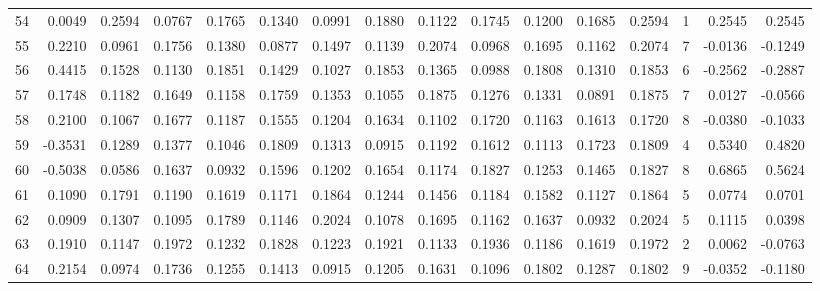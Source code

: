 \begin{tabular}{lrrrrrrrrrrrrrrr}
54  &      0.0049 &  0.2594 &  0.0767 &  0.1765 &  0.1340 &  0.0991 &  0.1880 &  0.1122 &  0.1745 &  0.1200 &   0.1685 &     0.2594 &      1 &                    0.2545 &                     0.2545 \\
55  &      0.2210 &  0.0961 &  0.1756 &  0.1380 &  0.0877 &  0.1497 &  0.1139 &  0.2074 &  0.0968 &  0.1695 &   0.1162 &     0.2074 &      7 &                   -0.0136 &                    -0.1249 \\
56  &      0.4415 &  0.1528 &  0.1130 &  0.1851 &  0.1429 &  0.1027 &  0.1853 &  0.1365 &  0.0988 &  0.1808 &   0.1310 &     0.1853 &      6 &                   -0.2562 &                    -0.2887 \\
57  &      0.1748 &  0.1182 &  0.1649 &  0.1158 &  0.1759 &  0.1353 &  0.1055 &  0.1875 &  0.1276 &  0.1331 &   0.0891 &     0.1875 &      7 &                    0.0127 &                    -0.0566 \\
58  &      0.2100 &  0.1067 &  0.1677 &  0.1187 &  0.1555 &  0.1204 &  0.1634 &  0.1102 &  0.1720 &  0.1163 &   0.1613 &     0.1720 &      8 &                   -0.0380 &                    -0.1033 \\
59  &     -0.3531 &  0.1289 &  0.1377 &  0.1046 &  0.1809 &  0.1313 &  0.0915 &  0.1192 &  0.1612 &  0.1113 &   0.1723 &     0.1809 &      4 &                    0.5340 &                     0.4820 \\
60  &     -0.5038 &  0.0586 &  0.1637 &  0.0932 &  0.1596 &  0.1202 &  0.1654 &  0.1174 &  0.1827 &  0.1253 &   0.1465 &     0.1827 &      8 &                    0.6865 &                     0.5624 \\
61  &      0.1090 &  0.1791 &  0.1190 &  0.1619 &  0.1171 &  0.1864 &  0.1244 &  0.1456 &  0.1184 &  0.1582 &   0.1127 &     0.1864 &      5 &                    0.0774 &                     0.0701 \\
62  &      0.0909 &  0.1307 &  0.1095 &  0.1789 &  0.1146 &  0.2024 &  0.1078 &  0.1695 &  0.1162 &  0.1637 &   0.0932 &     0.2024 &      5 &                    0.1115 &                     0.0398 \\
63  &      0.1910 &  0.1147 &  0.1972 &  0.1232 &  0.1828 &  0.1223 &  0.1921 &  0.1133 &  0.1936 &  0.1186 &   0.1619 &     0.1972 &      2 &                    0.0062 &                    -0.0763 \\
64  &      0.2154 &  0.0974 &  0.1736 &  0.1255 &  0.1413 &  0.0915 &  0.1205 &  0.1631 &  0.1096 &  0.1802 &   0.1287 &     0.1802 &      9 &                   -0.0352 &                    -0.1180 \\

\end{tabular}
